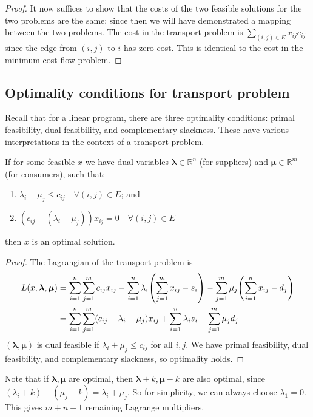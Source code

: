 \begin{proof}
	It now suffices to show that the costs of the two feasible solutions for the two problems are the same; since then we will have demonstrated a mapping between the two problems.
	The cost in the transport problem is \( \sum_{(i,j) \in E} x_{ij} c_{ij} \) since the edge from \( (i,j) \) to \( i \) has zero cost.
	This is identical to the cost in the minimum cost flow problem.
\end{proof}

\subsection{Optimality conditions for transport problem}
Recall that for a linear program, there are three optimality conditions: primal feasibility, dual feasibility, and complementary slackness.
These have various interpretations in the context of a transport problem.
\begin{theorem}
	If for some feasible \( x \) we have dual variables \( \bm \lambda \in \mathbb R^n \) (for suppliers) and \( \bm \mu \in \mathbb R^m \) (for consumers), such that:
	\begin{enumerate}
		\item \( \lambda_i + \mu_j \leq c_{ij} \quad \forall (i,j) \in E \); and
		\item \( (c_{ij} - (\lambda_i + \mu_j)) x_{ij} = 0 \quad \forall (i,j) \in E \)
	\end{enumerate}
	then \( x \) is an optimal solution.
\end{theorem}
\begin{proof}
	The Lagrangian of the transport problem is
	\begin{align*}
		L(x,\bm \lambda,\bm \mu) & = \sum_{i=1}^n \sum_{j=1}^m c_{ij}x_{ij} - \sum_{i=1}^n \lambda_i \qty(\sum_{j=1}^m x_{ij} - s_i) - \sum_{j=1}^m \mu_j \qty(\sum_{i=1}^n x_{ij} - d_j) \\
		                         & = \sum_{i=1}^n \sum_{j=1}^m (c_{ij} - \lambda_i - \mu_j) x_{ij} + \sum_{i=1}^n \lambda_i s_i + \sum_{j=1}^m \mu_j d_j
	\end{align*}
	\( (\bm \lambda, \bm \mu) \) is dual feasible if \( \lambda_i + \mu_j \leq c_{ij} \) for all \( i,j \).
	We have primal feasibility, dual feasibility, and complementary slackness, so optimality holds.
\end{proof}
Note that if \( \bm\lambda, \bm\mu \) are optimal, then \( \bm\lambda + k, \bm\mu - k \) are also optimal, since \( (\lambda_i + k) + (\mu_j - k) = \lambda_i + \mu_j \).
So for simplicity, we can always choose \( \lambda_1 = 0 \).
This gives \( m + n - 1 \) remaining Lagrange multipliers.
